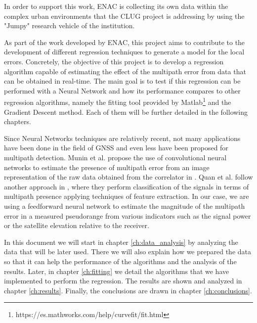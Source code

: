 \documentclass[a4paper, report, oneside, UKenglish]{memoir}
\begin{document}
In order to support this work, ENAC is collecting its own data within the complex urban environments that the CLUG project is addressing by using the "Jumpy" research vehicle of the institution.

As part of the work developed by ENAC, this project aims to contribute to the development of different regression techniques to generate a model for the local errors. Concretely, the objective of this project is to develop a regression algorithm capable of estimating the effect of the multipath error from data that can be obtained in real-time. The main goal is to test if this regression can be performed with a Neural Network and how its performance compares to other regression algorithms, namely the fitting tool provided by Matlab\footnote{https://es.mathworks.com/help/curvefit/fit.html} and the Gradient Descent method. Each of them will be further detailed in the following chapters. 

Since Neural Networks techniques are relatively recent, not many applications have been done in the field of GNSS and even less have been proposed for multipath detection. Munin et al. propose the use of convolutional neural networks to estimate the presence of multipath error from an image representation of the raw data obtained from the correlator in \cite{munin_convolutional_2019}. Quan et al. follow another approach in \cite{quan_convolutional_2018}, where they perform classification of the signals in terms of multipath presence applying techniques of feature extraction. In our case, we are using a feedforward neural network to estimate the magnitude of the multipath error in a measured pseudorange from various indicators such as the signal power or the satellite elevation relative to the receiver.

In this document we will start in chapter \ref{ch:data_analysis} by analyzing the data that will be later used. There we will also explain how we prepared the data so that it can help the performance of the algorithms and the analysis of the results. Later, in chapter \ref{ch:fitting} we detail the algorithms that we have implemented to perform the regression. The results are shown and analyzed in chapter \ref{ch:results}. Finally, the conclusions are drawn in chapter \ref{ch:conclusions}.

\end{document}
